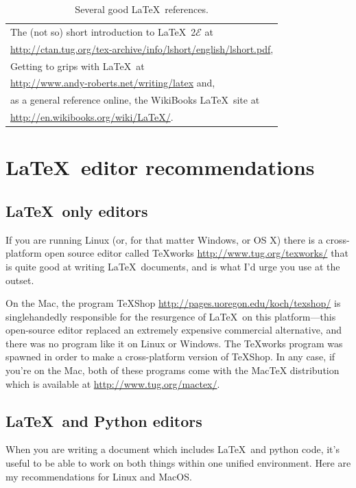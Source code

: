 \begin{table}
\centering
\begin{tabular}{l}\\ \hline
\noindent The (not so) short introduction to \LaTeX\ 2$\mathcal{E}$ at\\ \href{http://ctan.tug.org/tex-archive/info/lshort/english/lshort.pdf}{http://ctan.tug.org/tex-archive/info/lshort/english/lshort.pdf}, \\[1mm]
Getting to grips with \LaTeX\ at\\ \href{http://www.andy-roberts.net/writing/latex}{http://www.andy-roberts.net/writing/latex} and,\\[1mm]
as a general reference online, the WikiBooks \LaTeX\ site at\\ \href{http://en.wikibooks.org/wiki/LaTeX/}{http://en.wikibooks.org/wiki/LaTeX/}.\\
\hline
\end{tabular}
\caption[Several good \LaTeX\ references.]{Several good \LaTeX\ references.}
\label{tab:latexRefs}
\end{table}
\section{\LaTeX\ editor recommendations}
\subsection{\LaTeX\ only editors}
If you are running Linux (or, for that matter Windows, or OS X)
there is a cross-platform open source editor called TeXworks \href{http://www.tug.org/texworks/}{http://www.tug.org/texworks/} that is quite good at writing \LaTeX\ documents, and is what I'd urge you use at the outset. 

On the Mac, the program TeXShop \href{http://pages.uoregon.edu/koch/texshop/}{http://pages.uoregon.edu/koch/texshop/} is singlehandedly responsible for the resurgence of \LaTeX\ on this platform---this open-source editor replaced an extremely expensive commercial alternative, and there was no program like it on Linux or Windows. The TeXworks program was spawned in order to make a cross-platform version of TeXShop. In any case, if you're on the Mac, both of these programs come with the MacTeX distribution which is available at \href{http://www.tug.org/mactex/}{http://www.tug.org/mactex/}.
\subsection{\LaTeX\ and Python editors}
When you are writing a document which includes \LaTeX\ and  python code, it's useful to be able to work on both things within one unified environment. Here are my recommendations for Linux and MacOS. 

